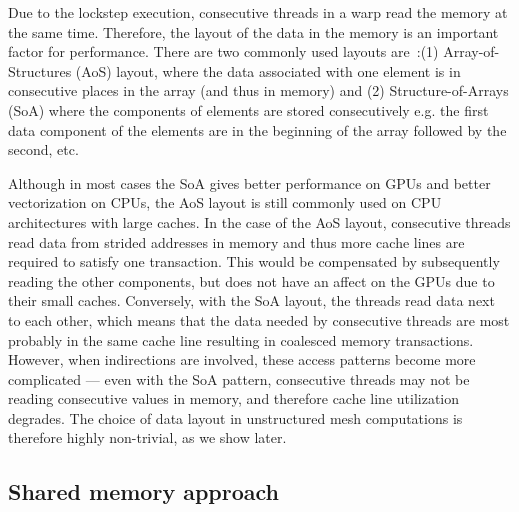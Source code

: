 Due to the lockstep execution, consecutive threads in a warp read the memory at 
the same time. Therefore, the layout of the data in the memory is an important 
factor for performance. There are two commonly used layouts 
are~\cite{sharma2015data}:(1) Array-of-Structures (AoS) layout, where the data 
associated with one element is in consecutive places in the array (and thus in 
memory) and (2) Structure-of-Arrays (SoA) where the components of elements are 
stored consecutively e.g. the first data component of the elements are in the 
beginning of the array followed by the second, etc.

Although in most cases the SoA gives better performance on GPUs and better
vectorization on CPUs, the AoS layout is still commonly used on CPU
architectures with large caches. In the case of the AoS layout, consecutive
threads read data from strided addresses in memory and thus more cache lines 
are required to satisfy one transaction. This would be compensated by 
subsequently reading the other components, but does not have an affect on 
the GPUs due to their small caches. Conversely, with the SoA layout, the 
threads read data next to each other, which means that the data needed by 
consecutive threads are most probably in the same cache line resulting in 
coalesced memory transactions. However, when indirections are involved, these
access patterns become more complicated --- even with the SoA pattern,
consecutive threads may not be reading consecutive values in memory, and
therefore cache line utilization degrades. The choice of data layout in
unstructured mesh computations is therefore highly non-trivial, as we show
later.


\subsection{Shared memory approach}\label{shared-memory-approach}

